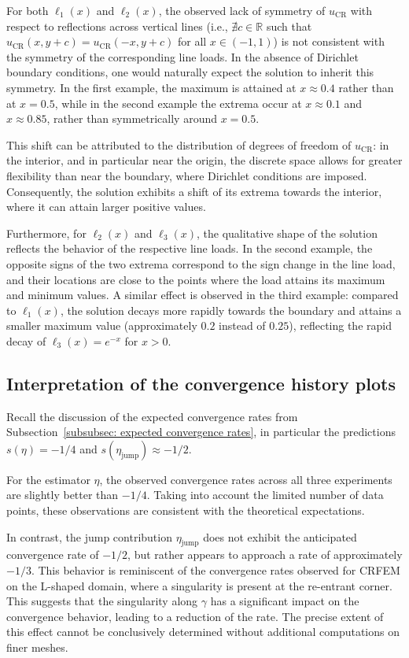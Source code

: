 \documentclass[11pt,a4paper]{article}
\newcommand{\uCR}{u_{\mathrm{CR}}}
\begin{document}
For both $\ell_1(x)$ and $\ell_2(x)$, the observed lack of symmetry of $\uCR$ with respect to reflections across vertical lines (i.e., $ \nexists c \in \mathbb{R}$ such that $\uCR(x,y+c) = \uCR(-x,y+c)$ for all $x \in (-1,1)$) is not consistent with the symmetry of the corresponding line loads. In the absence of Dirichlet boundary conditions, one would naturally expect the solution to inherit this symmetry. In the first example, the maximum is attained at $x \approx 0.4$ rather than at $x=0.5$, while in the second example the extrema occur at $x \approx 0.1$ and $x \approx 0.85$, rather than symmetrically around $x=0.5$. 

This shift can be attributed to the distribution of degrees of freedom of $\uCR$: in the interior, and in particular near the origin, the discrete space allows for greater flexibility than near the boundary, where Dirichlet conditions are imposed. Consequently, the solution exhibits a shift of its extrema towards the interior, where it can attain larger positive values.

Furthermore, for $\ell_2(x)$ and $\ell_3(x)$, the qualitative shape of the solution reflects the behavior of the respective line loads. In the second example, the opposite signs of the two extrema correspond to the sign change in the line load, and their locations are close to the points where the load attains its maximum and minimum values. A similar effect is observed in the third example: compared to $\ell_1(x)$, the solution decays more rapidly towards the boundary and attains a smaller maximum value (approximately $0.2$ instead of $0.25$), reflecting the rapid decay of $\ell_3(x)=e^{-x}$ for $x>0$.

\subsection{Interpretation of the convergence history plots}

Recall the discussion of the expected convergence rates from Subsection~\ref{subsubsec: expected convergence rates}, in particular the predictions $s(\eta)=-1/4$ and $s(\eta_{\mathrm{jump}})\approx -1/2$. 

For the estimator $\eta$, the observed convergence rates across all three experiments are slightly better than $-1/4$. Taking into account the limited number of data points, these observations are consistent with the theoretical expectations.

In contrast, the jump contribution $\eta_{\mathrm{jump}}$ does not exhibit the anticipated convergence rate of $-1/2$, but rather appears to approach a rate of approximately $-1/3$. This behavior is reminiscent of the convergence rates observed for CRFEM on the L-shaped domain, where a singularity is present at the re-entrant corner. This suggests that the singularity along $\gamma$ has a significant impact on the convergence behavior, leading to a reduction of the rate. The precise extent of this effect cannot be conclusively determined without additional computations on finer meshes.
\end{document}
